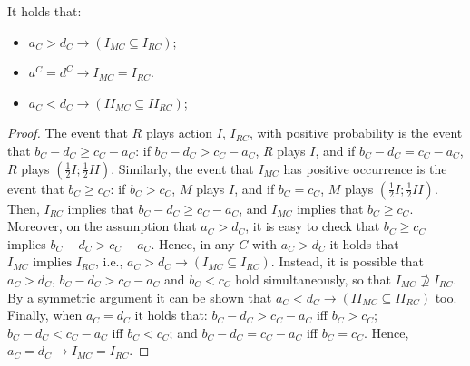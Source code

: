 \documentclass[fleqn,reqno,11pt]{article}
\begin{document}
\begin{lemma} \label{lemma:action implications}
It holds that:
  \begin{itemize}
  \item $a_{C}>d_{C}\rightarrow(I_{MC}\subseteq I_{RC})$;
  \item $a^{C}=d^{C}\rightarrow I_{MC}=I_{RC}$.
  \item $a_{C}<d_{C}\rightarrow(II_{MC}\subseteq II_{RC})$;
  \end{itemize}
\end{lemma}

\begin{proof}
The event that $R$ plays action $I$, $I_{RC}$, with positive probability is the event that $b_{C}-d_{C} \geq c_{C}-a_{C}$: if $b_{C}-d_{C}>c_{C}-a_{C}$, $R$ plays $I$, and if $b_{C}-d_{C}=c_{C}-a_{C}$, $R$ plays
  $(\frac{1}{2}I;\frac{1}{2}II)$. Similarly, the event that $I_{MC}$ has positive occurrence is the event that $b_{C} \geq c_{C}$: if $b_{C}>c_{C}$, $M$ plays $I$, and if
  $b_{C}=c_{C}$, $M$ plays $(\frac{1}{2}I;\frac{1}{2}II)$. 
Then, $I_{RC}$ implies that
  $b_{C}-d_{C}\geq c_{C}-a_{C}$, and $I_{MC}$ implies that $b_{C}\geq c_{C}$. Moreover, on the
  assumption that $a_{C}>d_{C}$, it is easy to check that $b_{C}\geq c_{C}$ implies
  $b_{C}-d_{C}>c_{C}-a_{C}$.  Hence, in any $C$ with $a_{C}>d_{C}$ it holds that
  $I_{MC}\mbox{ implies }I_{RC}$, i.e., $a_{C}>d_{C}\rightarrow(I_{MC}\subseteq I_{RC})$.
Instead, it is possible that $a_{C}>d_{C}$, $b_{C}-d_{C}>c_{C}-a_{C}$ and $b_{C}<c_{C}$ hold
  simultaneously, so that $I_{MC}\nsupseteq I_{RC}$.
By a symmetric argument it can be shown that
  $a_{C}<d_{C}\rightarrow(II_{MC}\subseteq II_{RC})$ too. Finally, when $a_{C}=d_{C}$ it holds
  that: $b_{C}-d_{C}>c_{C}-a_{C}$ iff $b_{C}>c_{C}$; $b_{C}-d_{C}<c_{C}-a_{C}$ iff
  $b_{C}<c_{C}$; and $b_{C}-d_{C}=c_{C}-a_{C}$ iff $b_{C}=c_{C}$. Hence,
  $a_{C}=d_{C}\rightarrow I_{MC}=I_{RC}$.
\end{proof}

\vspace{.5cm}
\end{document}
